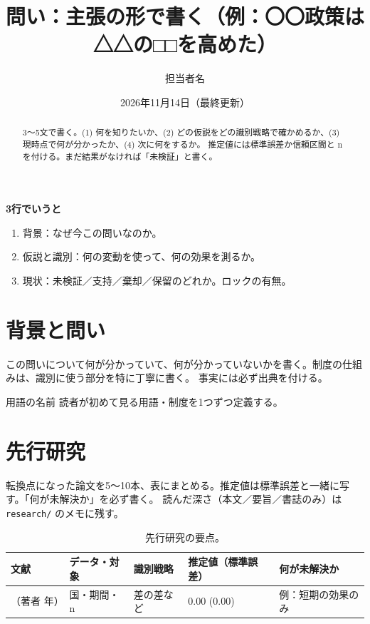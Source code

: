 \documentclass[a4paper,10pt]{ltjsarticle}
\title{問い：主張の形で書く（例：〇〇政策は△△の□□を高めた）}
\author{担当者名}
\date{2026年11月14日（最終更新）}
\begin{document}
\maketitle

\begin{abstract}
3〜5文で書く。(1) 何を知りたいか、(2) どの仮説をどの識別戦略で確かめるか、(3) 現時点で何が分かったか、(4) 次に何をするか。
推定値には標準誤差か信頼区間と n を付ける。まだ結果がなければ「未検証」と書く。
\end{abstract}

\begin{chaptermap}
\textbf{3行でいうと}
\begin{enumerate}[leftmargin=*]
  \item 背景：なぜ今この問いなのか。
  \item 仮説と識別：何の変動を使って、何の効果を測るか。
  \item 現状：未検証／支持／棄却／保留のどれか。ロックの有無。
\end{enumerate}
\end{chaptermap}

\section{背景と問い}\label{sec:bg}
この問いについて何が分かっていて、何が分かっていないかを書く。制度の仕組みは、識別に使う部分を特に丁寧に書く。
事実には必ず出典を付ける。

\begin{term}{用語の名前}
読者が初めて見る用語・制度を1つずつ定義する。
\end{term}

\section{先行研究}\label{sec:prior}
転換点になった論文を5〜10本、表にまとめる。推定値は標準誤差と一緒に写す。「何が未解決か」を必ず書く。
読んだ深さ（本文／要旨／書誌のみ）は \texttt{research/} のメモに残す。

\begin{table}[htbp]
\centering\small
\begin{tabularx}{\linewidth}{llllX}
\toprule
文献 & データ・対象 & 識別戦略 & 推定値（標準誤差） & 何が未解決か \\
\midrule
（著者 年） & 国・期間・n & 差の差など & 0.00 (0.00) & 例：短期の効果のみ \\
\bottomrule
\end{tabularx}
\caption{先行研究の要点。}
\label{tab:prior}
\end{table}
\end{document}
